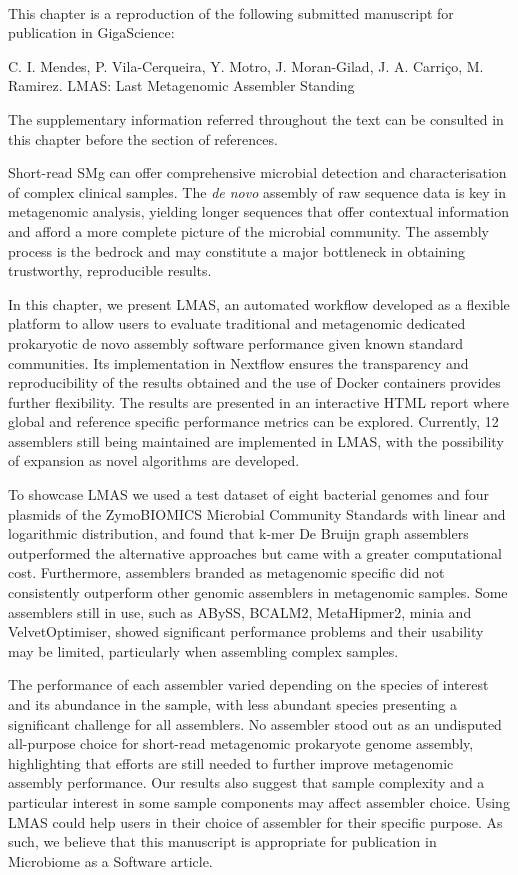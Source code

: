 \mbox{}\\
\vspace{8cm}

This chapter is a reproduction of the following submitted manuscript for publication in GigaScience:

C. I. Mendes, P. Vila-Cerqueira, Y. Motro, J. Moran-Gilad, J. A. Carriço, M. Ramirez. LMAS: Last Metagenomic Assembler Standing

The supplementary information referred throughout the text can be consulted in this chapter before the section of references.

Short-read \ac{SMg} can offer comprehensive microbial detection and characterisation of complex clinical samples. The \textit{de novo} assembly of raw sequence data is key in metagenomic analysis, yielding longer sequences that offer contextual information and afford a more complete picture of the microbial community. The assembly process is the bedrock and may constitute a major bottleneck in obtaining trustworthy, reproducible results.

In this chapter, we present LMAS, an automated workflow developed as a flexible platform to allow users to evaluate traditional and metagenomic dedicated prokaryotic de novo assembly software performance given known standard communities. Its implementation in Nextflow ensures the transparency and reproducibility of the results obtained and the use of Docker containers provides further flexibility. The results are presented in an interactive HTML report where global and reference specific performance metrics can be explored. Currently, 12 assemblers still being maintained are implemented in LMAS, with the possibility of expansion as novel algorithms are developed.

To showcase LMAS we used a test dataset of eight bacterial genomes and four plasmids of the ZymoBIOMICS Microbial Community Standards with linear and logarithmic distribution,  and found that k-mer De Bruijn graph assemblers outperformed the alternative approaches but came with a greater computational cost. Furthermore, assemblers branded as metagenomic specific did not consistently outperform other genomic assemblers in metagenomic samples. Some assemblers still in use, such as ABySS, BCALM2, MetaHipmer2, minia and VelvetOptimiser,  showed significant performance problems and their usability may be limited, particularly when assembling complex samples. 

The performance of each assembler varied depending on the species of interest and its abundance in the sample, with less abundant species presenting a significant challenge for all assemblers. No assembler stood out as an undisputed all-purpose choice for short-read metagenomic prokaryote genome assembly, highlighting that efforts are still needed to further improve metagenomic assembly performance. Our results also suggest that sample complexity and a particular interest in some sample components may affect assembler choice. Using LMAS could help users in their choice of assembler for their specific purpose.  As such, we believe that this manuscript is appropriate for publication in Microbiome as a Software article. 

